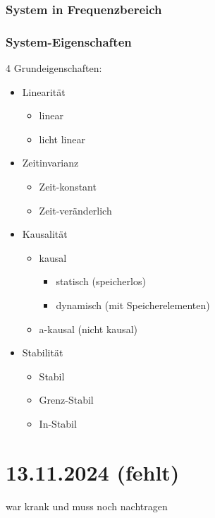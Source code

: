 \documentclass{article}
\begin{document}
\subsubsection*{System in Frequenzbereich}

\subsubsection*{System-Eigenschaften}
4 Grundeigenschaften:
\begin{itemize}
    \item Linearität
    \begin{itemize}
        \item linear
        \item licht linear
    \end{itemize}
    
    \item Zeitinvarianz
    \begin{itemize}
        \item Zeit-konstant
        \item Zeit-veränderlich
    \end{itemize}
    
    \item Kausalität
    \begin{itemize}
        \item kausal
        \begin{itemize}
            \item statisch (speicherlos)
            \item dynamisch (mit Speicherelementen)
        \end{itemize}
        \item a-kausal (nicht kausal)
    \end{itemize}
    
    \item Stabilität
    \begin{itemize}
        \item Stabil
        \item Grenz-Stabil
        \item In-Stabil
    \end{itemize}
\end{itemize}


\newpage
\section*{13.11.2024 (fehlt)}
war krank und muss noch nachtragen
\end{document}
